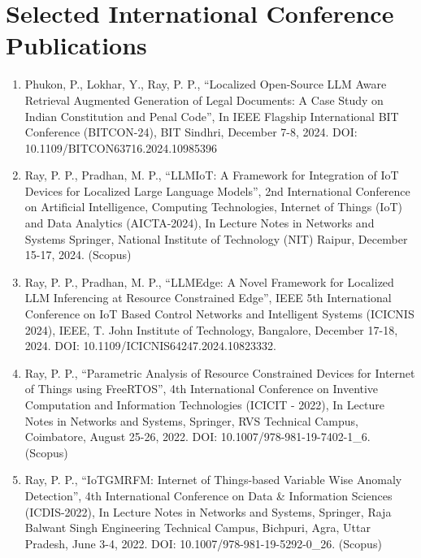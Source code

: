 \documentclass[11pt,a4paper]{moderncv}
\begin{document}
\section{\textbf{Selected International Conference Publications}}

\begin{adjustwidth}{6em}{0pt}
	\begin{enumerate}
	
	\item Phukon, P., Lokhar, Y., Ray, P. P., “Localized Open-Source LLM Aware Retrieval Augmented Generation of Legal Documents: A Case Study on Indian Constitution and Penal Code”, In IEEE Flagship International BIT Conference (BITCON-24), BIT Sindhri, December 7-8, 2024. DOI: 10.1109/BITCON63716.2024.10985396 
	
	\item Ray, P. P., Pradhan, M. P., “LLMIoT: A Framework for Integration of IoT Devices for Localized Large Language Models”, 2nd International Conference on Artificial Intelligence, Computing Technologies, Internet of Things (IoT) and Data Analytics (AICTA-2024), In Lecture Notes in Networks and Systems Springer, National Institute of Technology (NIT) Raipur, December 15-17, 2024. (Scopus)
	
	\item Ray, P. P., Pradhan, M. P., “LLMEdge: A Novel Framework for Localized LLM Inferencing at Resource Constrained Edge”, IEEE 5th International Conference on IoT Based Control Networks and Intelligent Systems (ICICNIS 2024), IEEE, T. John Institute of Technology, Bangalore, December 17-18, 2024. DOI: 10.1109/ICICNIS64247.2024.10823332.
	
	\item Ray, P. P., “Parametric Analysis of Resource Constrained Devices for Internet of Things using FreeRTOS”, 4th International Conference on Inventive Computation and Information Technologies (ICICIT - 2022), In Lecture Notes in Networks and Systems, Springer, RVS Technical Campus, Coimbatore, August 25-26, 2022. DOI: 10.1007/978-981-19-7402-1\_6. (Scopus)
	
	\item Ray, P. P., “IoTGMRFM: Internet of Things-based Variable Wise Anomaly Detection”, 4th International Conference on Data \& Information Sciences (ICDIS-2022), In Lecture Notes in Networks and Systems, Springer, Raja Balwant Singh Engineering Technical Campus, Bichpuri, Agra, Uttar Pradesh, June 3-4, 2022. DOI: 10.1007/978-981-19-5292-0\_26. (Scopus)
	

\end{enumerate}
\end{adjustwidth}
\end{document}
